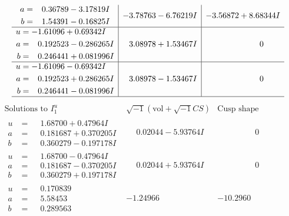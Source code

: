\documentclass[1p]{elsarticle_modified}
\theoremstyle{definition}
\newcommand{\I}{\sqrt{-1}}
\begin{document}
$$\begin{array}{c|c|c}
\begin{aligned}
a &= \phantom{-}0.36789 - 3.17819 I \\
b &= \phantom{-}1.54391 - 0.16825 I\end{aligned}
 & -3.78763 - 6.76219 I & -3.56872 + 8.68344 I \\ \hline\begin{aligned}
u &= -1.61096 + 0.69342 I \\
a &= \phantom{-}0.192523 - 0.286265 I \\
b &= \phantom{-}0.246441 + 0.081996 I\end{aligned}
 & \phantom{-}3.08978 + 1.53467 I & \phantom{-0.000000 } 0 \\ \hline\begin{aligned}
u &= -1.61096 - 0.69342 I \\
a &= \phantom{-}0.192523 + 0.286265 I \\
b &= \phantom{-}0.246441 - 0.081996 I\end{aligned}
 & \phantom{-}3.08978 - 1.53467 I & \phantom{-0.000000 } 0\\
 \hline 
 \end{array}$$\newpage$$\begin{array}{c|c|c}  
\text{Solutions to }I^u_{1}& \I (\text{vol} + \sqrt{-1}CS) & \text{Cusp shape}\\
 \hline 
\begin{aligned}
u &= \phantom{-}1.68700 + 0.47964 I \\
a &= \phantom{-}0.181687 + 0.370205 I \\
b &= \phantom{-}0.360279 - 0.197178 I\end{aligned}
 & \phantom{-}0.02044 - 5.93764 I & \phantom{-0.000000 } 0 \\ \hline\begin{aligned}
u &= \phantom{-}1.68700 - 0.47964 I \\
a &= \phantom{-}0.181687 - 0.370205 I \\
b &= \phantom{-}0.360279 + 0.197178 I\end{aligned}
 & \phantom{-}0.02044 + 5.93764 I & \phantom{-0.000000 } 0 \\ \hline\begin{aligned}
u &= \phantom{-}0.170839\phantom{ +0.000000I} \\
a &= \phantom{-}5.58453\phantom{ +0.000000I} \\
b &= \phantom{-}0.289563\phantom{ +0.000000I}\end{aligned}
 & -1.24966\phantom{ +0.000000I} & -10.2960\phantom{ +0.000000I} \\ \hline\begin{aligned}

\end{aligned}
\end{array}$$
\end{document}
